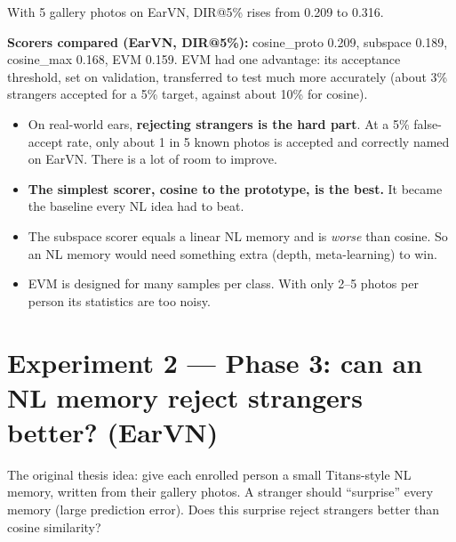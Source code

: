 \documentclass[11pt,a4paper]{article}
\begin{document}
With 5 gallery photos on EarVN, DIR@5\% rises from 0.209 to 0.316.

\textbf{Scorers compared (EarVN, DIR@5\%):} cosine\_proto 0.209, subspace 0.189, cosine\_max 0.168, EVM 0.159. EVM had one advantage: its acceptance threshold, set on validation, transferred to test much more accurately (about 3\% strangers accepted for a 5\% target, against about 10\% for cosine).

\begin{means}
\begin{itemize}[leftmargin=1.2em]
  \item On real-world ears, \textbf{rejecting strangers is the hard part}. At a 5\% false-accept rate, only about 1 in 5 known photos is accepted and correctly named on EarVN. There is a lot of room to improve.
  \item \textbf{The simplest scorer, cosine to the prototype, is the best.} It became the baseline every NL idea had to beat.
  \item The subspace scorer equals a linear NL memory and is \emph{worse} than cosine. So an NL memory would need something extra (depth, meta-learning) to win.
  \item EVM is designed for many samples per class. With only 2--5 photos per person its statistics are too noisy.
\end{itemize}
\end{means}

\section{Experiment 2 --- Phase 3: can an NL memory reject strangers better? (EarVN)}

\begin{question}
The original thesis idea: give each enrolled person a small Titans-style NL memory, written from their gallery photos. A stranger should ``surprise'' every memory (large prediction error). Does this surprise reject strangers better than cosine similarity?
\end{question}
\end{document}
